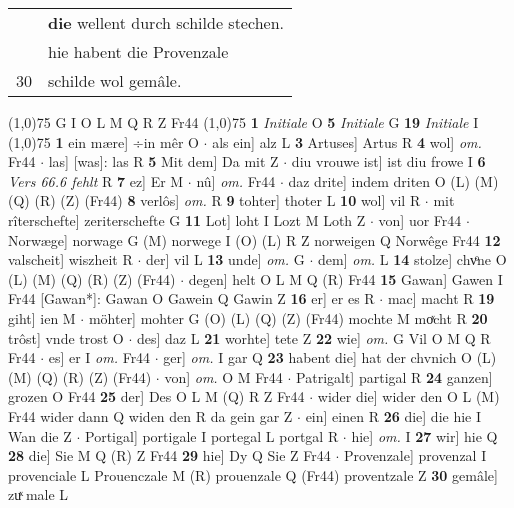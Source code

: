 \documentclass[8pt,a4paper,notitlepage]{article}
\begin{document}
\begin{table}[ht]
\begin{minipage}[t]{0.5\linewidth}
\begin{tabular}{rl}
 & \textbf{die} wellent durch schilde stechen.\\ 
 & hie habent die Provenzale\\ 
30 & schilde wol gemâle.\\ 
\end{tabular}
\scriptsize
\line(1,0){75} \newline
G I O L M Q R Z Fr44 \newline
\line(1,0){75} \newline
\textbf{1} \textit{Initiale} O  \textbf{5} \textit{Initiale} G  \textbf{19} \textit{Initiale} I  \newline
\line(1,0){75} \newline
\textbf{1} ein mære] ÷in mêr O  $\cdot$ als ein] alz L \textbf{3} Artuses] Artus R \textbf{4} wol] \textit{om.} Fr44  $\cdot$ las] [was]: las R \textbf{5} Mit dem] Da mit Z  $\cdot$ diu vrouwe ist] ist diu frowe I \textbf{6} \textit{Vers 66.6 fehlt} R  \textbf{7} ez] Er M  $\cdot$ nû] \textit{om.} Fr44  $\cdot$ daz drite] indem driten O (L) (M) (Q) (R) (Z) (Fr44) \textbf{8} verlôs] \textit{om.} R \textbf{9} tohter] thoter L \textbf{10} wol] vil R  $\cdot$ mit rîterschefte] zeriterschefte G \textbf{11} Lot] loht I Lozt M Loth Z  $\cdot$ von] uor Fr44  $\cdot$ Norwæge] norwage G (M) norwege I (O) (L) R Z norweigen Q Norwêge Fr44 \textbf{12} valscheit] wiszheit R  $\cdot$ der] vil L \textbf{13} unde] \textit{om.} G  $\cdot$ dem] \textit{om.} L \textbf{14} stolze] chvͦne O (L) (M) (Q) (R) (Z) (Fr44)  $\cdot$ degen] helt O L M Q (R) Fr44 \textbf{15} Gawan] Gawen I Fr44 [Gawan*]: Gawan O Gawein Q Gawin Z \textbf{16} er] er es R  $\cdot$ mac] macht R \textbf{19} giht] ien M  $\cdot$ möhter] mohter G (O) (L) (Q) (Z) (Fr44) mochte M moͯcht R \textbf{20} trôst] vnde trost O  $\cdot$ des] daz L \textbf{21} worhte] tete Z \textbf{22} wie] \textit{om.} G Vil O M Q R Fr44  $\cdot$ es] er I \textit{om.} Fr44  $\cdot$ ger] \textit{om.} I gar Q \textbf{23} habent die] hat der chvnich O (L) (M) (Q) (R) (Z) (Fr44)  $\cdot$ von] \textit{om.} O M Fr44  $\cdot$ Patrigalt] partigal R \textbf{24} ganzen] grozen O Fr44 \textbf{25} der] Des O L M (Q) R Z Fr44  $\cdot$ wider die] wider den O L (M) Fr44 wider dann Q widen den R da gein gar Z  $\cdot$ ein] einen R \textbf{26} die] die hie I Wan die Z  $\cdot$ Portigal] portigale I portegal L portgal R  $\cdot$ hie] \textit{om.} I \textbf{27} wir] hie Q \textbf{28} die] Sie M Q (R) Z Fr44 \textbf{29} hie] Dy Q Sie Z Fr44  $\cdot$ Provenzale] provenzal I provenciale L Prouenczale M (R) prouenzale Q (Fr44) proventzale Z \textbf{30} gemâle] zuͯ male L \newline

\end{minipage}
\end{table}
\end{document}
